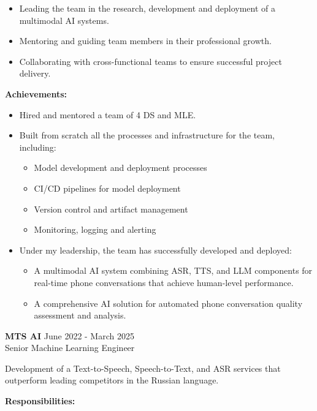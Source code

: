 \begin{itemize}[left=0pt, label={--}]
    \item Leading the team in the research, development and deployment of a multimodal AI systems.
    \item Mentoring and guiding team members in their professional growth.
    \item Collaborating with cross-functional teams to ensure successful project delivery.
\end{itemize}

\textbf{Achievements:}

\begin{itemize}[left=0pt, label={--}]
    \item Hired and mentored a team of 4 DS and MLE.
    \item Built from scratch all the processes and infrastructure for the team, including:
    \begin{itemize}[topsep=0pt]
        \item Model development and deployment processes
        \item CI/CD pipelines for model deployment
        \item Version control and artifact management
        \item Monitoring, logging and alerting
    \end{itemize}
    \item Under my leadership, the team has successfully developed and deployed:
    \begin{itemize}[topsep=0pt]
        \item A multimodal AI system combining ASR, TTS, and LLM components for real-time phone conversations that achieve human-level performance.
        \item A comprehensive AI solution for automated phone conversation quality assessment and analysis.
    \end{itemize}
\end{itemize}

\textbf{MTS AI} \hfill June 2022 - March 2025 \\
Senior Machine Learning Engineer

Development of a Text-to-Speech, Speech-to-Text, and ASR services that outperform leading competitors in the Russian language.

\textbf{Responsibilities:}

